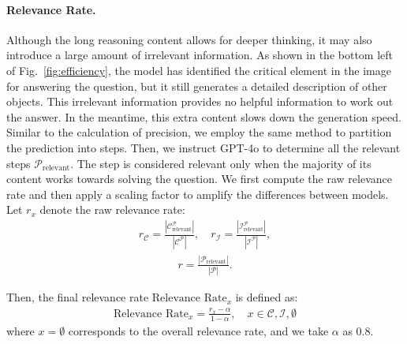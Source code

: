 \paragraph{Relevance Rate.}
Although the long reasoning content allows for deeper thinking, it may also introduce a large amount of irrelevant information.
As shown in the bottom left of Fig.~\ref{fig:efficiency}, the model has identified the critical element in the image for answering the question, but it still generates a detailed description of other objects.
This irrelevant information provides no helpful information to work out the answer. In the meantime, this extra content slows down the generation speed. Similar to the calculation of precision, we employ the same method to partition the prediction into steps. Then, we instruct GPT-4o to determine all the relevant steps $\mathcal{P}_\text{relevant}$. The step is considered relevant only when the majority of its content works towards solving the question. 
We first compute the raw relevance rate and then apply a scaling factor to amplify the differences between models. Let $r_x$ denote the raw relevance rate:
\begin{align}
r_{\mathcal{C}} = \frac{\left| \mathcal{C}^{\mathcal{P}}_{\text{relevant}} \right|}{\left| \mathcal{C}^{\mathcal{P}} \right|}, \quad
r_{\mathcal{I}} = \frac{\left| \mathcal{I}^{\mathcal{P}}_{\text{relevant}} \right|}{\left| \mathcal{I}^{\mathcal{P}} \right|},
\end{align}
\vspace{-0.6cm}
\begin{align}
r = \frac{\left| {\mathcal{P}}_{\text{relevant}} \right|}{\left| \mathcal{P} \right|}.
\end{align}

Then, the final relevance rate $\text{Relevance Rate}_{x}$ is defined as:
\begin{align}
\text{Relevance Rate}_{x} = \frac{r_x-\alpha}{1-\alpha}, \quad x \in {\mathcal{C}, \mathcal{I}, \emptyset}
\end{align}
where $x = \emptyset$ corresponds to the overall relevance rate, and we take $\alpha$ as $0.8$.



\vspace{-1em}
